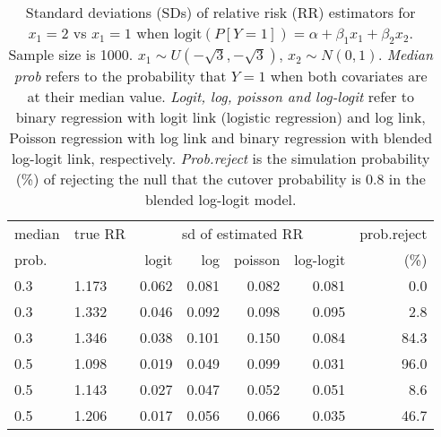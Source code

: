 \documentclass[12pt,a4paper]{article}
\begin{document}
\begin{table}[H] 
\small\sf\centering 
\caption{Standard deviations (SDs) of relative risk (RR) estimators for $x_1=2$ vs $x_1=1$ when $\mbox{logit}(P[Y=1])=\alpha+\beta_1 x_1 + \beta_2 x_2$. Sample size is 1000. $x_1 \sim $$U(-\sqrt{3},-\sqrt{3})$, $x_2 \sim N(0,1)$. {\it Median prob} refers to the probability that $Y=1$ when both covariates are at their median value. {\it Logit, log, poisson and log-logit} refer to binary regression with logit link (logistic regression) and log link, Poisson regression with log link and binary regression with blended log-logit link, respectively. {\it Prob.reject} is the simulation probability (\%) of rejecting the null that the cutover probability is $0.8$ in the blended log-logit model.} 
\begin{tabular}{llrrrrr} 
\toprule 
median & true RR & \multicolumn{4}{c}{sd of estimated RR} & prob.reject \\ 
prob. & & logit & log & poisson & log-logit  & (\%) \\ \midrule 
0.3 & 1.173 & 0.062 & 0.081 & 0.082 & 0.081 &  0.0 \\  
0.3 & 1.332 & 0.046 & 0.092 & 0.098 & 0.095 &  2.8 \\  
0.3 & 1.346 & 0.038 & 0.101 & 0.150 & 0.084 & 84.3 \\  
0.5 & 1.098 & 0.019 & 0.049 & 0.099 & 0.031 & 96.0 \\  
0.5 & 1.143 & 0.027 & 0.047 & 0.052 & 0.051 &  8.6 \\  
0.5 & 1.206 & 0.017 & 0.056 & 0.066 & 0.035 & 46.7 \\  
\bottomrule 
\end{tabular} 
\end{table} 
\end{document}
